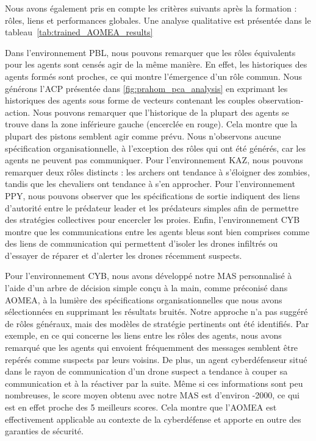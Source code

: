 Nous avons également pris en compte les critères suivants après la formation : rôles, liens et performances globales. Une analyse qualitative est présentée dans le tableau~\ref{tab:trained_AOMEA_results}
%

%
%
Dans l'environnement PBL, nous pouvons remarquer que les rôles équivalents pour les agents sont censés agir de la même manière. En effet, les historiques des agents formés sont proches, ce qui montre l'émergence d'un rôle commun. Nous générons l'ACP présentée dans \autoref{fig:prahom_pca_analysis} en exprimant les historiques des agents sous forme de vecteurs contenant les couples observation-action. Nous pouvons remarquer que l'historique de la plupart des agents se trouve dans la zone inférieure gauche (encerclée en rouge). Cela montre que la plupart des pistons semblent agir comme prévu. Nous n'observons aucune spécification organisationnelle, à l'exception des rôles qui ont été générés, car les agents ne peuvent pas communiquer. Pour l'environnement KAZ, nous pouvons remarquer deux rôles distincts : les archers ont tendance à s'éloigner des zombies, tandis que les chevaliers ont tendance à s'en approcher. Pour l'environnement PPY, nous pouvons observer que les spécifications de sortie indiquent des liens d'autorité entre le prédateur leader et les prédateurs simples afin de permettre des stratégies collectives pour encercler les proies. Enfin, l'environnement CYB montre que les communications entre les agents bleus sont bien comprises comme des liens de communication qui permettent d'isoler les drones infiltrés ou d'essayer de réparer et d'alerter les drones récemment suspects.

Pour l'environnement CYB, nous avons développé notre MAS personnalisé à l'aide d'un arbre de décision simple conçu à la main, comme préconisé dans AOMEA, à la lumière des spécifications organisationnelles que nous avons sélectionnées en supprimant les résultats bruités. Notre approche n'a pas suggéré de rôles généraux, mais des modèles de stratégie pertinents ont été identifiés. Par exemple, en ce qui concerne les liens entre les rôles des agents, nous avons remarqué que les agents qui envoient fréquemment des messages semblent être repérés comme suspects par leurs voisins. De plus, un agent cyberdéfenseur situé dans le rayon de communication d'un drone suspect a tendance à couper sa communication et à la réactiver par la suite. Même si ces informations sont peu nombreuses, le score moyen obtenu avec notre MAS est d'environ -2000, ce qui est en effet proche des 5 meilleurs scores. Cela montre que l'AOMEA est effectivement applicable au contexte de la cyberdéfense et apporte en outre des garanties de sécurité.




